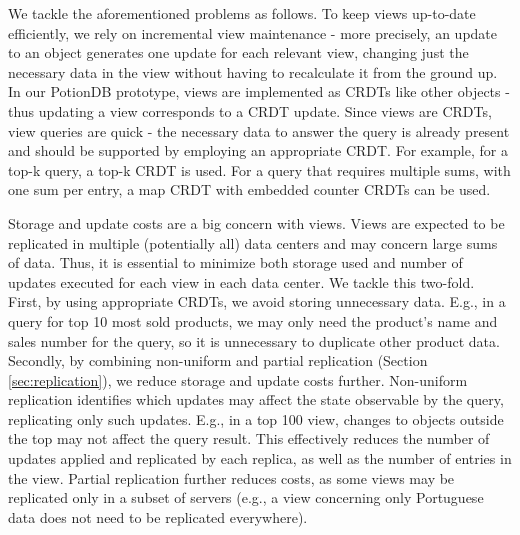 We tackle the aforementioned problems as follows.
To keep views up-to-date efficiently, we rely on incremental view maintenance - more precisely, an update to an object generates one update for each relevant view, changing just the necessary data in the view without having to recalculate it from the ground up.
In our PotionDB prototype, views are implemented as CRDTs like other objects - thus updating a view corresponds to a CRDT update.
Since views are CRDTs, view queries are quick - the necessary data to answer the query is already present and should be supported by employing an appropriate CRDT.
For example, for a top-k query, a top-k CRDT is used. For a query that requires multiple sums, with one sum per entry, a map CRDT with embedded counter CRDTs can be used.

Storage and update costs are a big concern with views.
Views are expected to be replicated in multiple (potentially all) data centers and may concern large sums of data.
Thus, it is essential to minimize both storage used and number of updates executed for each view in each data center.
We tackle this two-fold.
First, by using appropriate CRDTs, we avoid storing unnecessary data.
E.g., in a query for top 10 most sold products, we may only need the product's name and sales number for the query, so it is unnecessary to duplicate other product data.
Secondly, by combining non-uniform and partial replication (Section \ref{sec:replication}), we reduce storage and update costs further.
 Non-uniform replication identifies which updates may affect the state observable by the query, replicating only such updates. %
 E.g., in a top 100 view, changes to objects outside the top may not affect the query result.
 This effectively reduces the number of updates applied and replicated by each replica, as well as the number of entries in the view.
 Partial replication further reduces costs, as some views may be replicated only in a subset of servers (e.g., a view concerning only Portuguese data does not need to be replicated everywhere).
 
